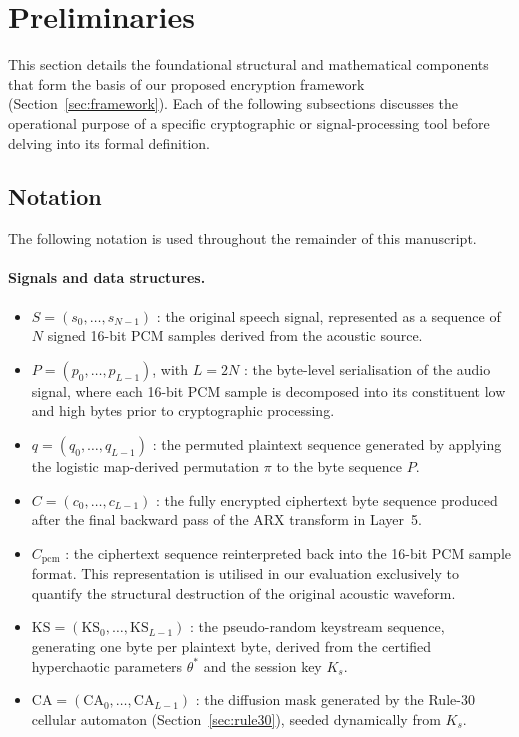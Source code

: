 \documentclass[pdflatex,sn-mathphys-num]{sn-jnl}%
\theoremstyle{thmstyleone}%
\theoremstyle{thmstyletwo}%
\theoremstyle{thmstylethree}%
\begin{document}
\section{Preliminaries}
\label{sec:prelim}

This section details the foundational structural and mathematical components that form the basis of our proposed encryption framework (Section~\ref{sec:framework}). Each of the following subsections discusses the operational purpose of a specific cryptographic or signal-processing tool before delving into its formal definition.

\subsection{Notation}
\label{sec:notation}

The following notation is used throughout the remainder of this manuscript.

\paragraph{Signals and data structures.}
\begin{itemize}[leftmargin=2em]
\item $S = (s_0,\dots,s_{N-1})$ : the original speech signal, represented as a sequence of $N$ signed 16-bit PCM samples derived from the acoustic source.
\item $P = (p_0,\dots,p_{L-1})$, with $L=2N$ : the byte-level serialisation of the audio signal, where each 16-bit PCM sample is decomposed into its constituent low and high bytes prior to cryptographic processing.
\item $q = (q_0,\dots,q_{L-1})$ : the permuted plaintext sequence generated by applying the logistic map-derived permutation $\pi$ to the byte sequence $P$.
\item $C = (c_0,\dots,c_{L-1})$ : the fully encrypted ciphertext byte sequence produced after the final backward pass of the ARX transform in Layer~5.
\item $C_{\mathrm{pcm}}$ : the ciphertext sequence reinterpreted back into the 16-bit PCM sample format. This representation is utilised in our evaluation exclusively to quantify the structural destruction of the original acoustic waveform.
\item $\mathrm{KS}=(\mathrm{KS}_0,\dots,\mathrm{KS}_{L-1})$ : the pseudo-random keystream sequence, generating one byte per plaintext byte, derived from the certified hyperchaotic parameters $\theta^\ast$ and the session key $K_s$.
\item $\mathrm{CA}=(\mathrm{CA}_0,\dots,\mathrm{CA}_{L-1})$ : the diffusion mask generated by the Rule-30 cellular automaton (Section~\ref{sec:rule30}), seeded dynamically from $K_s$.
\end{itemize}
\end{document}
